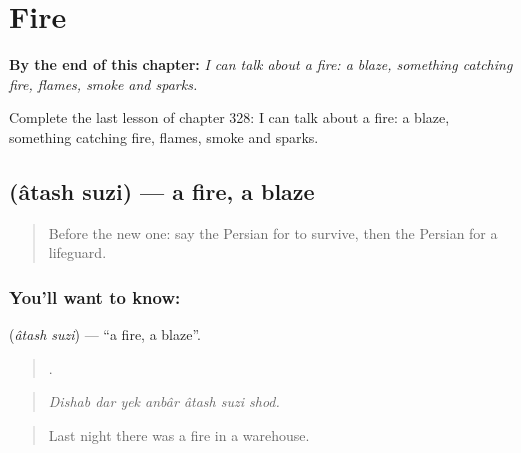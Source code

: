 
\chapter{Fire}
\label{ch:fa-fire}

\begin{chapteropening}
\textbf{By the end of this chapter:} \emph{I can talk about a fire: a blaze, something catching fire, flames, smoke and sparks.}

Complete the last lesson of chapter 328: I can talk about a fire: a blaze, something catching fire, flames, smoke and sparks.
\end{chapteropening}

\section[\texorpdfstring{\fa{آتش} \fa{سوزی} (âtash suzi)}{آتش سوزی (âtash suzi)}]{  (âtash suzi) — a fire, a blaze}

\label{lesson:FA-C328-atash-suzi}



\begin{quote}
Before the new one: say the Persian for to survive, then the Persian for a lifeguard.
\end{quote}

\subsection*{You'll want to know:  }
\textbf{ } (\emph{âtash suzi}) — \textquotedblleft{}a fire, a blaze\textquotedblright{}.

\begin{quote}
      .
\end{quote}

\begin{quote}
\emph{Dishab dar yek anbâr âtash suzi shod.}
\end{quote}

\begin{quote}
Last night there was a fire in a warehouse.
\end{quote}

